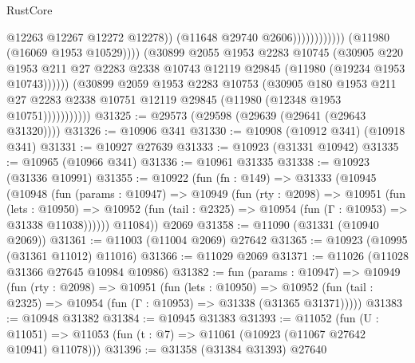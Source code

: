 \begin{lexlean}{RustCore}
\begin{coremodule}
                                                    @12263
                                                    @12267
                                                    @12272
                                                    @12278))
                                                (@11648 @29740 @2606))))))))))))
                          (@11980 (@16069 @1953 @10529))))
                      (@30899
                        @2055
                        @1953
                        @2283
                        @10745
                        (@30905
                          @220
                          @1953
                          @211
                          @27
                          @2283
                          @2338
                          @10743
                          @12119
                          @29845
                          (@11980 (@19234 @1953 @10743))))))
                  (@30899
                    @2059
                    @1953
                    @2283
                    @10753
                    (@30905
                      @180
                      @1953
                      @211
                      @27
                      @2283
                      @2338
                      @10751
                      @12119
                      @29845
                      (@11980 (@12348 @1953 @10751)))))))))))
@31325 := @29573 (@29598 (@29639 (@29641 (@29643 @31320))))
@31326 := @10906 @341
@31330 := @10908 (@10912 @341) (@10918 @341)
@31331 := @10927 @27639
@31333 := @10923 (@31331 @10942)
@31335 := @10965 (@10966 @341)
@31336 := @10961 @31335
@31338 := @10923 (@31336 @10991)
@31355 := @10922
    (fun (fn : @149) =>
    @31333
      (@10945
        (@10948
          (fun (params : @10947) =>
          @10949
            (fun (rty : @2098) =>
            @10951
              (fun (lets : @10950) =>
              @10952 (fun (tail : @2325) => @10954 (fun (Γ : @10953) => @31338 @11038))))))
        @11084))
    @2069
@31358 := @11090 (@31331 (@10940 @2069))
@31361 := @11003 (@11004 @2069) @27642
@31365 := @10923 (@10995 (@31361 @11012) @11016)
@31366 := @11029 @2069
@31371 := @11026 (@11028 @31366 @27645 @10984 @10986)
@31382 := fun (params : @10947) =>
  @10949
    (fun (rty : @2098) =>
    @10951
      (fun (lets : @10950) =>
      @10952 (fun (tail : @2325) => @10954 (fun (Γ : @10953) => @31338 (@31365 @31371)))))
@31383 := @10948 @31382
@31384 := @10945 @31383
@31393 := @11052
    (fun (U : @11051) => @11053 (fun (t : @7) => @11061 (@10923 (@11067 @27642 @10941) @11078)))
@31396 := @31358 (@31384 @31393) @27640

\end{coremodule}
\end{lexlean}
